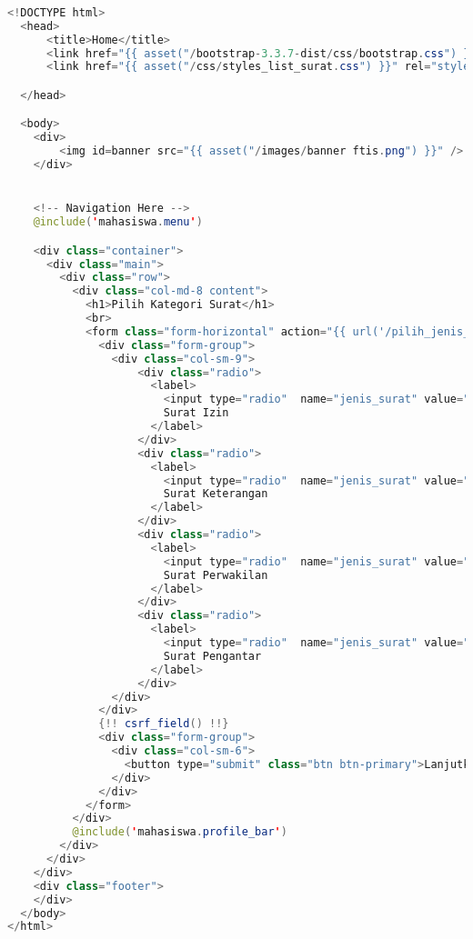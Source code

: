\begin{lstlisting}[language=Java,basicstyle=\tiny,caption=Pilih kategori surat]
	
<!DOCTYPE html>
  <head>
      <title>Home</title>
      <link href="{{ asset("/bootstrap-3.3.7-dist/css/bootstrap.css") }}" rel="stylesheet" type="text/css" />
      <link href="{{ asset("/css/styles_list_surat.css") }}" rel="stylesheet" type="text/css">

  </head>

  <body>
    <div>
        <img id=banner src="{{ asset("/images/banner ftis.png") }}" />
    </div>


    <!-- Navigation Here -->
    @include('mahasiswa.menu')

    <div class="container">
      <div class="main">
        <div class="row">
          <div class="col-md-8 content">
            <h1>Pilih Kategori Surat</h1>
            <br>
            <form class="form-horizontal" action="{{ url('/pilih_jenis_surat') }}" method="post">
              <div class="form-group">
                <div class="col-sm-9">
                    <div class="radio">
                      <label>
                        <input type="radio"  name="jenis_surat" value="surat_izin" required>
                        Surat Izin
                      </label>
                    </div>
                    <div class="radio">
                      <label>
                        <input type="radio"  name="jenis_surat" value="surat_keterangan" required>
                        Surat Keterangan
                      </label>
                    </div>
                    <div class="radio">
                      <label>
                        <input type="radio"  name="jenis_surat" value="surat_perwakilan" required>
                        Surat Perwakilan
                      </label>
                    </div>
                    <div class="radio">
                      <label>
                        <input type="radio"  name="jenis_surat" value="surat_pengantar" required>
                        Surat Pengantar
                      </label>
                    </div>
                </div>
              </div>
              {!! csrf_field() !!}
              <div class="form-group">
                <div class="col-sm-6">
                  <button type="submit" class="btn btn-primary">Lanjutkan</button>
                </div>
              </div>
            </form>
          </div>
          @include('mahasiswa.profile_bar')
        </div>
      </div>
    </div>
    <div class="footer">
    </div>
  </body>
</html>

\end{lstlisting}

